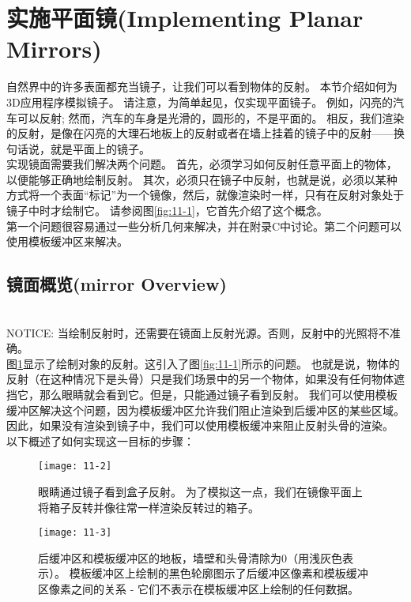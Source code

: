 \section{实施平面镜(Implementing Planar Mirrors)}
\begin{flushleft}
自然界中的许多表面都充当镜子，让我们可以看到物体的反射。 本节介绍如何为3D应用程序模拟镜子。 请注意，为简单起见，仅实现平面镜子。 例如，闪亮的汽车可以反射; 然而，汽车的车身是光滑的，圆形的，不是平面的。 相反，我们渲染的反射，是像在闪亮的大理石地板上的反射或者在墙上挂着的镜子中的反射——换句话说，就是平面上的镜子。\\

实现镜面需要我们解决两个问题。 首先，必须学习如何反射任意平面上的物体，以便能够正确地绘制反射。 其次，必须只在镜子中反射，也就是说，必须以某种方式将一个表面“标记”为一个镜像，然后，就像渲染时一样，只有在反射对象处于镜子中时才绘制它。 请参阅图\ref{fig:11-1}，它首先介绍了这个概念。\\

第一个问题很容易通过一些分析几何来解决，并在附录C中讨论。第二个问题可以使用模板缓冲区来解决。
\end{flushleft}

\subsection{镜面概览(mirror Overview)}
\begin{flushleft}
~\\
NOTICE: 当绘制反射时，还需要在镜面上反射光源。否则，反射中的光照将不准确。
~\\
图\ref{fig:11-2}显示了绘制对象的反射。这引入了图\ref{fig:11-1}所示的问题。 也就是说，物体的反射（在这种情况下是头骨）只是我们场景中的另一个物体，如果没有任何物体遮挡它，那么眼睛就会看到它。但是，只能通过镜子看到反射。 我们可以使用模板缓冲区解决这个问题，因为模板缓冲区允许我们阻止渲染到后缓冲区的某些区域。因此，如果没有渲染到镜子中，我们可以使用模板缓冲来阻止反射头骨的渲染。 以下概述了如何实现这一目标的步骤：\\
\end{flushleft}

\begin{figure}[h]
    \texttt{[image: 11-2]}
    \centering
    \caption{眼睛通过镜子看到盒子反射。 为了模拟这一点，我们在镜像平面上将箱子反转并像往常一样渲染反转过的箱子。}
    \label{fig:11-2}
\end{figure}

\begin{figure}[h]
    \texttt{[image: 11-3]}
    \centering
    \caption{后缓冲区和模板缓冲区的地板，墙壁和头骨清除为0（用浅灰色表示）。 模板缓冲区上绘制的黑色轮廓图示了后缓冲区像素和模板缓冲区像素之间的关系 - 它们不表示在模板缓冲区上绘制的任何数据。}
    \label{fig:11-3}
\end{figure}

